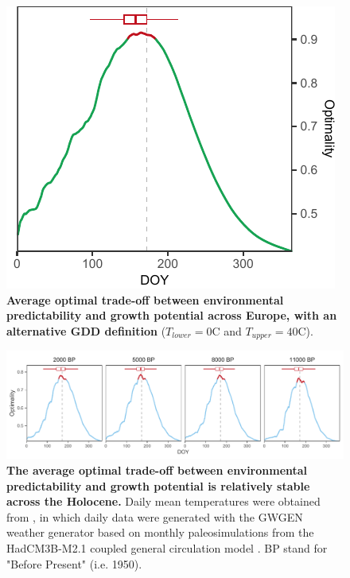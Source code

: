 \documentclass[11pt,letter]{article}
\begin{document}
\clearpage

\begin{figure}[h]
\centering
\includegraphics[scale = .9]{global_optimality_0_40.pdf} %
\vspace*{-0.cm}
\caption{\textbf{Average optimal trade-off between environmental predictability and growth potential across Europe, with an alternative GDD definition} ($T_{lower}=0$\degree C and $T_{upper}=40$\degree C).}
\label{fig:altgdd}
\end{figure}


\begin{figure}[h]
\vspace*{-0.3cm}
\hspace*{-1.2cm}
\includegraphics[scale = 1]{optimality_holocene.pdf}
\vspace*{-0.7cm}
\caption{\textbf{The average optimal trade-off between environmental predictability and growth potential is relatively stable across the Holocene.} Daily mean temperatures were obtained from \citet{VanderMeersch2024}, in which daily data were generated with the GWGEN weather generator \citep{Sommer2017} based on monthly paleosimulations from the HadCM3B-M2.1 coupled general circulation model \citep{Armstrong2019}. BP stand for "Before Present" (i.e. 1950).}
\label{fig:holocene}
\end{figure}
\end{document}
